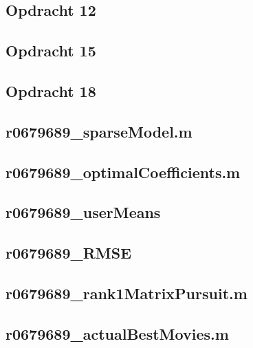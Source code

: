 \documentclass[11pt, a4paper, titlepage, openright]{article}
\begin{document}
	\subsection{Opdracht 12}
		
	\subsection{Opdracht 15}
		
	\subsection{Opdracht 18}
		

    \subsection{r0679689\_sparseModel.m}
		
    \subsection{r0679689\_optimalCoefficients.m}
		
	\subsection{r0679689\_userMeans}
		
    \subsection{r0679689\_RMSE}
		
    \subsection{r0679689\_rank1MatrixPursuit.m}
		
    \subsection{r0679689\_actualBestMovies.m}
		
\end{document}

